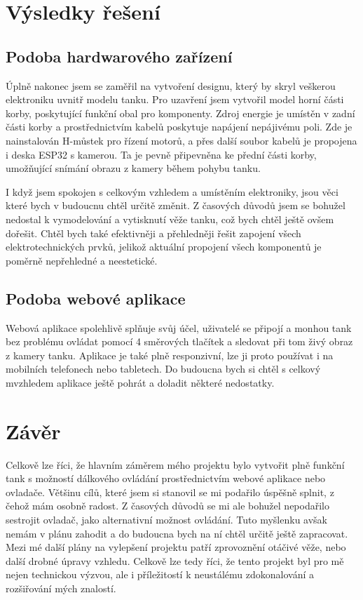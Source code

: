 \documentclass[12pt, a4paper,
oneside
openany
]{report}
\begin{document}
	\chapter{Výsledky řešení}

    \section{Podoba hardwarového zařízení}
\noindent Úplně nakonec jsem se zaměřil na vytvoření designu, který by skryl veškerou elektroniku uvnitř modelu tanku. Pro uzavření jsem vytvořil model horní části korby, poskytující funkční obal pro komponenty. Zdroj energie je umístěn v zadní části korby a prostřednictvím kabelů poskytuje napájení nepájivému poli. Zde je nainstalován H-můstek pro řízení motorů, a přes další soubor kabelů je propojena i deska ESP32 s kamerou. Ta je pevně připevněna ke přední části korby, umožňující snímání obrazu z kamery během pohybu tanku.

\noindent I když jsem spokojen s celkovým vzhledem a umístěním elektroniky, jsou věci které bych v budoucnu chtěl určitě změnit. Z časových důvodů jsem se bohužel nedostal k vymodelování a vytisknutí věže tanku, což bych chtěl ještě ovšem dořešit. Chtěl bych také efektivněji a přehledněji řešit zapojení všech elektrotechnických prvků, jelikož aktuální propojení všech komponentů je poměrně nepřehledné a neestetické. 

    
    \section{Podoba webové aplikace}
    
    Webová aplikace spolehlivě splňuje svůj účel, uživatelé se připojí a monhou tank bez problému ovládat pomocí 4 směrových tlačítek a sledovat při tom živý obraz z kamery tanku. Aplikace je také plně responzivní, lze ji proto používat i na mobilních telefonech nebo tabletech. Do budoucna bych si chtěl s celkový mvzhledem aplikace ještě pohrát a doladit některé nedostatky.
	
	\chapter*{Závěr}
	
    Celkově lze říci, že hlavním záměrem mého projektu bylo vytvořit plně funkční tank s možností dálkového ovládání prostřednictvím webové aplikace nebo ovladače. Většinu cílů, které jsem si stanovil se mi podařilo úspěšně splnit, z čehož mám osobně radost. Z časových důvodů se mi ale bohužel nepodařilo sestrojit ovladač, jako alternativní možnost ovládání. Tuto myšlenku avšak nemám v plánu zahodit a do budoucna bych na ní chtěl určitě ještě zapracovat. Mezi mé další plány na vylepšení projektu patří zprovoznění otáčivé věže, nebo další drobné úpravy vzhledu. Celkově lze tedy říci, že tento projekt byl pro mě nejen technickou výzvou, ale i příležitostí k neustálému zdokonalování a rozšiřování mých znalostí.
	
\end{document}
